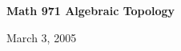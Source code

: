 \def\ccy{\Cyan}		  %
\def\cpb{\ProcessBlue}	  %
\def\csb{\SkyBlue}	  %
\def\ctu{\Turquoise}	  %
\def\ctb{\TealBlue}	  %
\def\caq{\Aquamarine}	  %
\def\cbg{\BlueGreen}	  %
\def\cem{\Emerald}	  %
\def\csg{\SeaGreen}	  %
\def\cgg{\Green}	  %
\def\cfg{\ForestGreen}	  %
\def\cpg{\PineGreen}	  %
\def\clg{\LimeGreen}	  %
\def\cyg{\YellowGreen}	  %
\def\cspg{\SpringGreen}	  %
\def\cog{\OliveGreen}	  %
\def\pars{\RawSienna}	  %
\def\cse{\Sepia}		  %
\def\cbr{\Brown}		  %
\def\cta{\Tan}		  %
\def\cgr{\Gray}		  %
\def\cbl{\Black}		  %
\def\cwh{\White}		  %


\loadmsbm



\def\ctln{\centerline}
\def\u{\underbar}
\def\ssk{\smallskip}
\def\msk{\medskip}
\def\bsk{\bigskip}
\def\hsk{\hskip.1in}
\def\hhsk{\hskip.2in}
\def\dsl{\displaystyle}
\def\hskp{\hskip1.5in}

\def\lra{$\Leftrightarrow$ }
\def\ra{\rightarrow}
\def\mpto{\logmapsto}
\def\pu{\pi_1}
\def\mpu{$\pi_1$}
\def\sig{\Sigma}
\def\msig{$\Sigma$}
\def\ep{\epsilon}
\def\sset{\subseteq}
\def\del{\partial}
\def\inv{^{-1}}
\def\wtl{\widetilde}
\def\lra{\Leftrightarrow}



\ctln{\bf Math 971 Algebraic Topology}

\ssk

\ctln{March 3, 2005}

\msk


